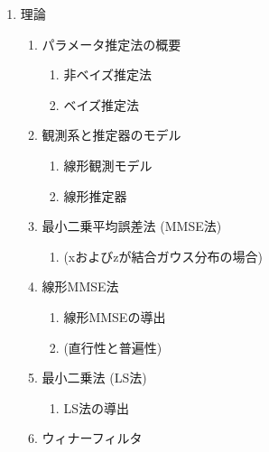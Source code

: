 \documentclass[
  9pt
]{jsarticle}
\providecommand{\tightlist}{%
  \setlength{\itemsep}{0pt}\setlength{\parskip}{0pt}}
\begin{document}
\begin{enumerate}
\def\labelenumi{\arabic{enumi}.}
\setcounter{enumi}{1}
\tightlist
\item
  理論

  \begin{enumerate}
  \def\labelenumii{\arabic{enumii}.}
  \tightlist
  \item
    パラメータ推定法の概要

    \begin{enumerate}
    \def\labelenumiii{\arabic{enumiii}.}
    \tightlist
    \item
      非ベイズ推定法
    \item
      ベイズ推定法
    \end{enumerate}
  \item
    観測系と推定器のモデル

    \begin{enumerate}
    \def\labelenumiii{\arabic{enumiii}.}
    \tightlist
    \item
      線形観測モデル
    \item
      線形推定器
    \end{enumerate}
  \item
    最小二乗平均誤差法 (MMSE法)

    \begin{enumerate}
    \def\labelenumiii{\arabic{enumiii}.}
    \tightlist
    \item
      (xおよびzが結合ガウス分布の場合)
    \end{enumerate}
  \item
    線形MMSE法

    \begin{enumerate}
    \def\labelenumiii{\arabic{enumiii}.}
    \tightlist
    \item
      線形MMSEの導出
    \item
      (直行性と普遍性)
    \end{enumerate}
  \item
    最小二乗法 (LS法)

    \begin{enumerate}
    \def\labelenumiii{\arabic{enumiii}.}
    \tightlist
    \item
      LS法の導出
    \end{enumerate}
  \item
    ウィナーフィルタ


\end{enumerate}
\end{enumerate}
\end{document}
